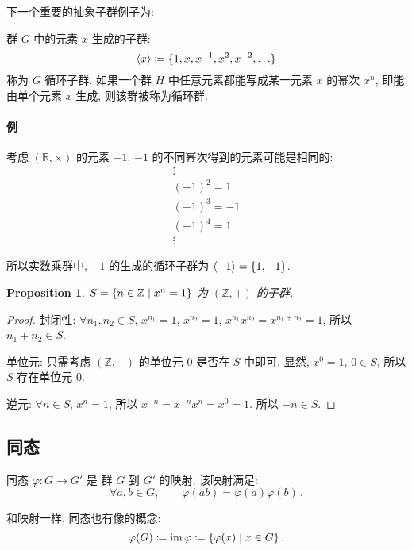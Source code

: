 \documentclass[UTF8]{ctexart}
\theoremstyle{mystyle}
\newtheorem{proposition}{Proposition}[section]
\theoremstyle{myremark}
\theoremstyle{plain}
\newcommand{\R}{\mathbb R}
\newcommand{\Z}{\mathbb Z}
\DeclareMathOperator{\im}{im}
\DeclarePairedDelimiter\set{\{}{\}}
\begin{document}
下一个重要的抽象子群例子为:
\begin{definition}
    群 $ G $ 中的元素 $ x $ 生成的子群: 
    \[ \langle x \rangle \coloneqq \set{1, x, x^{-1}, x^2, x^{-2}, \dots} \]
    称为 $ G $ 循环子群. 如果一个群 $ H $ 中任意元素都能写成某一元素 $ x $ 的幂次 $ x^n $, 即能由单个元素 $ x $ 生成, 则该群被称为循环群.
\end{definition}

\paragraph{例}
考虑 $ (\R, \times) $ 的元素 $ -1 $. $ -1 $ 的不同幂次得到的元素可能是相同的:
\[ \begin{array}{c}
    \vdots \\
    (-1)^2 = 1 \\
    (-1)^3 = -1 \\
    (-1)^4 = 1 \\
    \vdots
\end{array} \]

所以实数乘群中, $ -1 $ 的生成的循环子群为 $ \langle -1 \rangle = \set{1, -1} $.


\begin{proposition}
    $ S = \set{n \in \Z \mid x^n = 1} $ 为 $ (\Z, +) $ 的子群.
\end{proposition}

\begin{proof}
    封闭性: $ \forall n_1, n_2 \in S $, $ x^{n_1} = 1 $, $ x^{n_2} = 1 $, $ x^{n_1} x^{n_2} = x^{n_1 + n_2} = 1 $, 所以 $ n_1 + n_2 \in S $.

    单位元: 只需考虑 $ (\Z, +) $ 的单位元 $ 0 $ 是否在 $ S $ 中即可. 显然, $ x^0 = 1 $, $ 0 \in S $, 所以 $ S $ 存在单位元 $ 0 $.

    逆元: $ \forall n \in S $, $ x^n = 1 $, 所以 $ x^{-n} = x^{-n} x^n = x^0 = 1 $. 所以 $ -n \in S $.
\end{proof}


\subsection{同态}
\begin{definition}
    同态 $ \varphi \colon G \to G' $ 是 群 $ G $ 到 $ G' $ 的映射, 该映射满足:
    \[ \forall a, b \in G, \qquad \varphi(a b) = \varphi(a) \varphi(b) \,.\]

    和映射一样, 同态也有像的概念:
    \[ \varphi(G) \coloneqq \im \varphi \coloneqq \set{\varphi(x) \mid x \in G} \,.\]
\end{definition}
\end{document}
